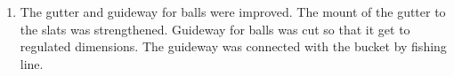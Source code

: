 \begin{enumerate}
\begin{enumerate}
		\item The gutter and guideway for balls were improved. The mount of the gutter to the slats was strengthened. Guideway for balls was cut so that it get to regulated dimensions. The guideway was connected with the bucket by fishing line.
		\begin{figure}[H]
			\begin{minipage}[h]{0.26\linewidth}
			\end{minipage}
			\hfill
			\begin{minipage}[h]{0.24\linewidth}
			\end{minipage}
			\hfill
			\begin{minipage}[h]{0.24\linewidth}

\end{minipage}
\end{figure}
\end{enumerate}
\end{enumerate}
